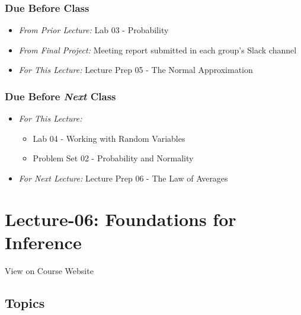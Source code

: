 \documentclass[]{book}
\providecommand{\tightlist}{%
  \setlength{\itemsep}{0pt}\setlength{\parskip}{0pt}}
\theoremstyle{definition}
\theoremstyle{definition}
\theoremstyle{definition}
\theoremstyle{remark}
\begin{document}
\hypertarget{due-before-class-4}{%
\subsubsection*{Due Before Class}\label{due-before-class-4}}

\begin{itemize}
\tightlist
\item
  \emph{From Prior Lecture:} Lab 03 - Probability
\item
  \emph{From Final Project:} Meeting report submitted in each group's
  Slack channel
\item
  \emph{For This Lecture:} Lecture Prep 05 - The Normal Approximation
\end{itemize}

\hypertarget{due-before-next-class-5}{%
\subsubsection*{\texorpdfstring{Due Before \emph{Next}
Class}{Due Before Next Class}}\label{due-before-next-class-5}}

\begin{itemize}
\tightlist
\item
  \emph{For This Lecture:}

  \begin{itemize}
  \tightlist
  \item
    Lab 04 - Working with Random Variables
  \item
    Problem Set 02 - Probability and Normality
  \end{itemize}
\item
  \emph{For Next Lecture:} Lecture Prep 06 - The Law of Averages
\end{itemize}

\hypertarget{lecture-06-foundations-for-inference}{%
\section*{Lecture-06: Foundations for
Inference}\label{lecture-06-foundations-for-inference}}

View on Course Website

\hypertarget{topics-6}{%
\subsection*{Topics}\label{topics-6}}
\end{document}

